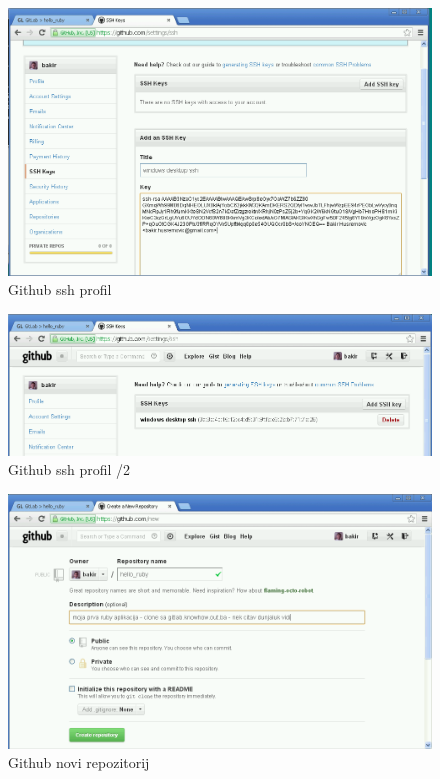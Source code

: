 \documentclass[times, utf8, seminar]{fit}
\begin{document}
\begin{figure}[H]
\centering
\includegraphics[width=15cm]{img/github_ssh_profile.png}
\caption{Github ssh profil}
\end{figure}

\begin{figure}[H]
\centering
\includegraphics[width=15cm]{img/github_ssh_profile_2.png}
\caption{Github ssh profil /2}
\end{figure}


\begin{figure}[H]
\centering
\includegraphics[width=15cm]{img/github_new_repos.png}
\caption{Github novi repozitorij}
\end{figure}
\end{document}
